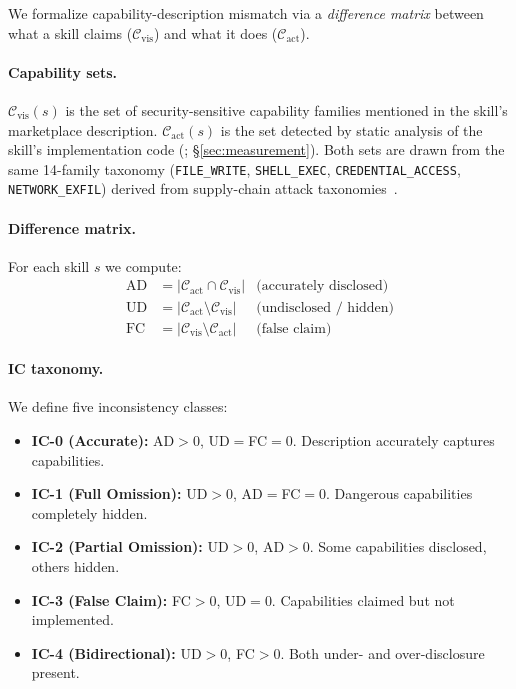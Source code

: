 
We formalize capability-description mismatch via a
\emph{difference matrix} between what a skill claims ($\mathcal{C}_{\text{vis}}$)
and what it does ($\mathcal{C}_{\text{act}}$).

\paragraph{Capability sets.}
$\mathcal{C}_{\text{vis}}(s)$ is the set of security-sensitive capability
families mentioned in the skill's marketplace description.
$\mathcal{C}_{\text{act}}(s)$ is the set detected by static analysis
of the skill's implementation code (\lscps; \S\ref{sec:measurement}).
Both sets are drawn from the same 14-family taxonomy
(\eg \texttt{FILE\_WRITE}, \texttt{SHELL\_EXEC}, \texttt{CREDENTIAL\_ACCESS},
\texttt{NETWORK\_EXFIL})
derived from supply-chain attack taxonomies~\cite{ohm2020backstabber,ladisa2023taxonomy}.

\paragraph{Difference matrix.}
For each skill $s$ we compute:
\begin{align*}
\text{AD}&=|\mathcal{C}_{\text{act}} \cap \mathcal{C}_{\text{vis}}| &
\text{(accurately disclosed)}\\
\text{UD}&=|\mathcal{C}_{\text{act}} \setminus \mathcal{C}_{\text{vis}}| &
\text{(undisclosed / hidden)}\\
\text{FC}&=|\mathcal{C}_{\text{vis}} \setminus \mathcal{C}_{\text{act}}| &
\text{(false claim)}
\end{align*}

\paragraph{IC taxonomy.}
We define five inconsistency classes:
\begin{itemize}[leftmargin=*,topsep=2pt,itemsep=1pt]
  \item \textbf{IC-0 (Accurate):} AD$>$0, UD$=$FC$=$0. Description accurately captures capabilities.
  \item \textbf{IC-1 (Full Omission):} UD$>$0, AD$=$FC$=$0. Dangerous capabilities completely hidden.
  \item \textbf{IC-2 (Partial Omission):} UD$>$0, AD$>$0. Some capabilities disclosed, others hidden.
  \item \textbf{IC-3 (False Claim):} FC$>$0, UD$=$0. Capabilities claimed but not implemented.
  \item \textbf{IC-4 (Bidirectional):} UD$>$0, FC$>$0. Both under- and over-disclosure present.
\end{itemize}

